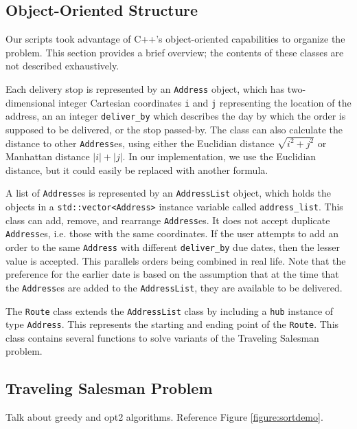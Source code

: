 \documentclass[letterpaper]{article}
\begin{document}
    \subsection{Object-Oriented Structure}
    \label{subsection:Object-Oriented_Structure}
    Our scripts took advantage of C++'s object-oriented capabilities to organize the problem. This section provides a brief overview; the contents of these classes are not described exhaustively.
    
    Each delivery stop is represented by an \verb|Address| object, which has two-dimensional integer Cartesian coordinates \verb|i| and \verb|j| representing the location of the address, an an integer \verb|deliver_by| which describes the day by which the order is supposed to be delivered, or the stop passed-by. The class can also calculate the distance to other \verb|Address|es, using either the Euclidian distance $\sqrt{i^{2} + j^{2}}$ or Manhattan distance $|i| + |j|$. In our implementation, we use the Euclidian distance, but it could easily be replaced with another formula.

    A list of \verb|Address|es is represented by an \verb|AddressList| object, which holds the objects in a \verb|std::vector<Address>| instance variable called \verb|address_list|. This class can add, remove, and rearrange \verb|Address|es. It does not accept duplicate \verb|Address|es, i.e. those with the same coordinates. If the user attempts to add an order to the same \verb|Address| with different \verb|deliver_by| due dates, then the lesser value is accepted. This parallels orders being combined in real life. Note that the preference for the earlier date is based on the assumption that at the time that the \verb|Address|es are added to the \verb|AddressList|, they are available to be delivered.

    The \verb|Route| class extends the \verb|AddressList| class by including a \verb|hub| instance of type \verb|Address|. This represents the starting and ending point of the \verb|Route|. This class contains several functions to solve variants of the Traveling Salesman problem.

    \subsection{Traveling Salesman Problem}
    \label{subsection:Traveling_Salesman_Problem}

    Talk about greedy and opt2 algorithms. Reference Figure \ref{figure:sortdemo}.
\end{document}
